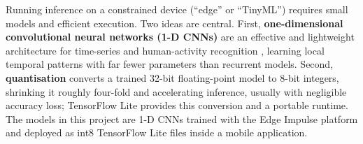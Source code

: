 Running inference on a constrained device (``edge'' or ``TinyML'') requires
small models and efficient execution. Two ideas are central. First,
\textbf{one-dimensional convolutional neural networks (1-D CNNs)} are an
effective and lightweight architecture for time-series and human-activity
recognition \cite{ronao2016, hatcnn}, learning local temporal patterns with far
fewer parameters than recurrent models. Second, \textbf{quantisation} converts
a trained 32-bit floating-point model to 8-bit integers, shrinking it roughly
four-fold and accelerating inference, usually with negligible accuracy loss;
TensorFlow Lite \cite{tflite} provides this conversion and a portable runtime.
The models in this project are 1-D CNNs trained with the Edge Impulse platform
\cite{edgeimpulse} and deployed as int8 TensorFlow Lite files inside a mobile
application.
